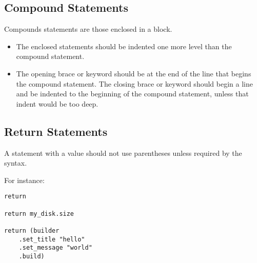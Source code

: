 \subsection{Compound Statements}

Compounds statements are those enclosed in a block. 
\begin{itemize}
\item The enclosed statements should be indented one more level than the compound statement. 
\item The opening brace or keyword should be at the end of the line that begins the compound statement. The closing brace or keyword should begin a line and be indented to the beginning of the compound statement, unless that indent would be too deep. 
\end{itemize}





\subsection{Return Statements}

A  statement with a value should not use parentheses unless required by the syntax.

\example For instance: 
\begin{lstlisting}
return

return my_disk.size

return (builder
    .set_title "hello"
    .set_message "world"
    .build)
\end{lstlisting}














